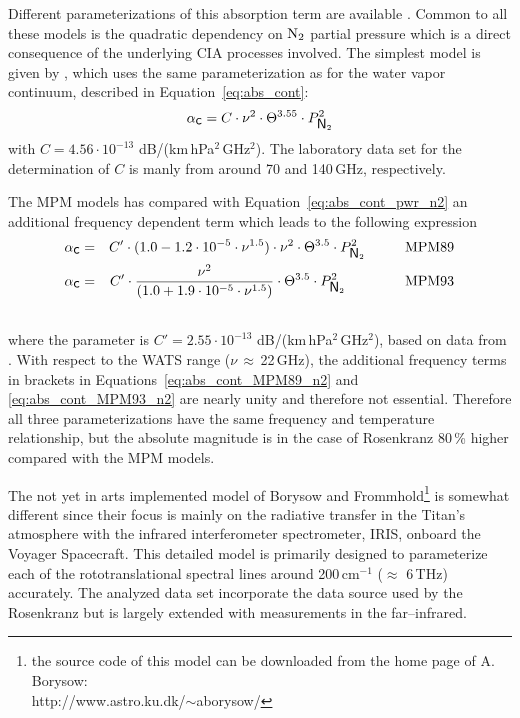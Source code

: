 {Different parameterizations of this absorption term are
available \citet{pwr:93,liebeetal:93,borysow:86}. Common to all these 
models is the quadratic dependency on $\mbox{N}_2$ partial pressure which is 
a direct consequence of the underlying CIA processes involved.
The simplest model is given by \citet{pwr:93}, which uses 
the same parameterization as for the water vapor continuum, described 
in Equation~\ref{eq:abs_cont}:
\begin{equation}
  \label{eq:abs_cont_pwr_n2}
    \alpha_{\mbox{\sf c}} =  C \cdot \nu^2 \cdot \Theta^{3.55} \cdot P_{\mbox{\sf N}_{2}}^2
\end{equation}
with $C = 4.56\cdot 10^{-13}$ dB/(km\,hPa$^2$\,GHz$^2$). The
laboratory data set for the determination of $C$ is manly from 
\citet{dagg:75,dagg:78} around 70 and 140\,GHz, respectively.

The MPM models has compared with Equation~\ref{eq:abs_cont_pwr_n2} 
an additional frequency dependent term which leads to the 
following expression
\begin{eqnarray}
  \label{eq:abs_cont_MPM89_n2}
    \alphac &=& C' \cdot (1.0-1.2\cdot10^{-5}\cdot
               \nu^{1.5}) \cdot \nu^2 \cdot \Theta^{3.5} \cdot \pnz^2
               \hspace*{10mm}\mbox{MPM89}\\
%
  \label{eq:abs_cont_MPM93_n2}
    \alphac &=& C' \cdot \frac{\nu^2}{(1.0+1.9\cdot10^{-5}\cdot \nu^{1.5})} 
                \cdot \Theta^{3.5} \cdot \pnz^2
                \hspace*{15mm}\mbox{MPM93}\\
\nonumber
\end{eqnarray}
where the parameter is $C' = 2.55\cdot 10^{-13}$ dB/(km\,hPa$^2$\,GHz$^2$),
based on data from \citet{stankevich:74}. 
With respect to the WATS range ($\nu$\,$\approx$\,22\,GHz), 
the additional frequency terms in brackets in 
Equations~\ref{eq:abs_cont_MPM89_n2} and \ref{eq:abs_cont_MPM93_n2}
are nearly unity and therefore not essential. Therefore all
three parameterizations have the same frequency and temperature
relationship, but the absolute magnitude is in the case of Rosenkranz
80\,\% higher compared with the MPM models.

The not yet in arts implemented model of Borysow and 
Frommhold\footnote{{the source code of this
  model can be downloaded from the home page of A. Borysow:}\\
  http://www.astro.ku.dk/$\sim$aborysow/} is somewhat different since their 
focus is mainly on the radiative transfer in the Titan's atmosphere
with the infrared interferometer spectrometer, IRIS, onboard the
Voyager Spacecraft. This detailed model is primarily
designed to parameterize each of the rototranslational spectral lines 
around 200\,cm$^{-1}$ ($\approx$ 6\,THz) accurately. The analyzed data
set incorporate the data source used by the Rosenkranz but is largely 
extended with measurements in the far--infrared.



}
